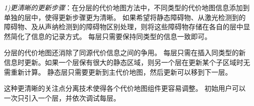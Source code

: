 \emph{\color{blue}1)更清晰的更新步骤}：在分层的代价地图方法中，不同类型的代价地图信息添加到单独的层中，使得更新步骤更为清晰。 如果希望将静态障碍物、从激光检测到的障碍物、及从声纳检测到的障碍物区别处理，则将这些障碍物存储在各自的层中显然简化了信息的记录方式。 每层只需要保持同类型的信息一致即可。

分层的代价地图还消除了同源代价信息之间的争用。 每层只需在插入同类型的新信息时更新。如果一个层保有很大的静态区域，则另一个层在更新某个子区域时无需重新计算。 静态层只需要更新到主代价地图，然后更新可以移到下一层。

这种更清晰的关注点分离技术使得各个代价地图组件更容易调整。 初始用户可以一次只引入一个层，并依次调试每层。

